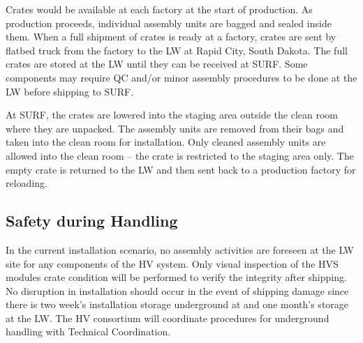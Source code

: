 Crates would be available at each factory at the start of production. %
As production proceeds, individual assembly units are bagged and sealed inside them.
When a full shipment of crates is ready at a factory, crates are sent by flatbed truck from the factory to the LW at Rapid City, South Dakota.  The full crates are stored at the LW until they can be received at SURF.  Some components may require QC and/or minor assembly procedures to be done at the LW before shipping to SURF.

At SURF, the crates are lowered into the staging area outside the clean room where they are unpacked. The assembly units are removed from their bags and taken into the clean room for installation. Only cleaned assembly units are allowed into the clean room -- the crate is restricted to the staging area only. The empty crate is returned to the LW and then sent back to a production factory for reloading. 


\subsection{Safety during Handling} %
\label{sec:fdsp-hv-transport-safety}


In the current installation scenario, no assembly activities are foreseen at the LW site for any components of the HV system. Only visual inspection of the HVS modules crate condition will be performed to verify the integrity after shipping. %
No disruption in installation should occur in the event of shipping damage since there is two week's installation storage underground at \surf and one month's storage at the LW.  The HV consortium will coordinate procedures for underground handling with Technical Coordination.

